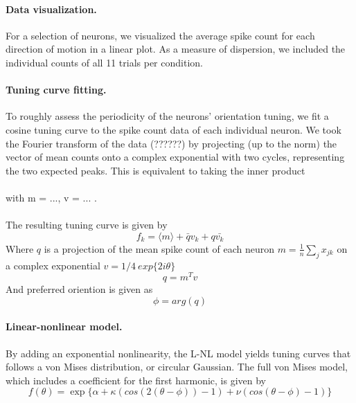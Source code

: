 \documentclass[10pt]{article}
\begin{document}
\paragraph{Data visualization.} For a selection of neurons, we visualized the average spike count for each direction of motion in a linear plot. As a measure of dispersion, we included the individual counts of all 11 trials per condition.

\paragraph{Tuning curve fitting.} To roughly assess the periodicity of the neurons' orientation tuning, we fit a cosine tuning curve to the spike count data of each individual neuron. We took the Fourier transform of the data (??????) by projecting (up to the norm) the vector of mean counts onto a complex exponential with two cycles, representing the two expected peaks. This is equivalent to taking the inner product \\ \\
with m = ...,  v = ... . \\ \\
The resulting tuning curve is given by \\

\begin{equation*}
f_k = \langle m \rangle + \bar{q} v_k + q \bar{v_k} 
\end{equation*}
Where $q$ is a projection of the mean spike count of each neuron $m = \frac{1}{n} \sum_j x_{jk}$ on a complex exponential $v = 1/4\ exp \{2i \theta\} $
\begin{equation*}
q = m^Tv
\end{equation*}
And preferred oriention is given as 
\begin{equation*}
\phi = arg(q)
\end{equation*}
\paragraph{Linear-nonlinear model.} By adding an exponential nonlinearity, the L-NL model yields tuning curves that follows a von Mises distribution, or circular Gaussian. The full von Mises model, which includes a coefficient for the first harmonic, is given by
\begin{equation*}
f(\theta) = \exp\{ \alpha+\kappa(cos(2(\theta-\phi))-1)+\nu(cos(\theta-\phi)-1)\}
\end{equation*}
\end{document}
